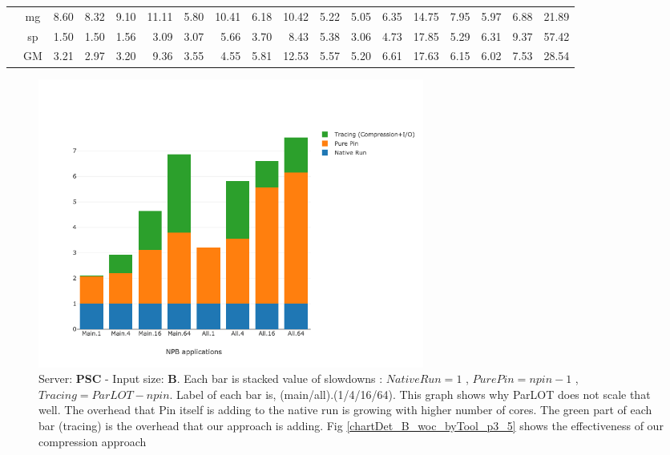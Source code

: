 \begin{table}[]
\begin{center}
{\begin{tabular}{|c|c|rrrr|rrrr|rrrr|rrrr|}
 &  mg  &  8.60  & \cellcolor{blue!25} 8.32  &  9.10  &  11.11  &  5.80  &  10.41  & \cellcolor{blue!25}  6.18  &  10.42  &   5.22  & \cellcolor{blue!25}  5.05  &   6.35  &  14.75  &  7.95  & \cellcolor{blue!25} 5.97  &  6.88  &  21.89 \\
 &  sp  &  1.50  &  1.50  &  1.56  &   3.09  &  3.07  &   5.66  & \cellcolor{blue!25}  3.70  &   8.43  &   5.38  & \cellcolor{blue!25}  3.06  &   4.73  &  17.85  &  5.29  &  6.31  &  9.37  &  57.42 \\ \cline{2-18}
 &  GM  &  3.21  & \cellcolor{blue!25} 2.97  &  3.20  &   9.36  &  3.55  &   4.55  &   5.81  &  12.53  &   5.57  & \cellcolor{blue!25}  5.20  &   6.61  &  17.63  &  6.15  & \cellcolor{blue!25} 6.02  &  7.53  &  28.54 \\
\hline 
\end{tabular} }

\end{center}
\end{table}

\begin{figure}[!t]
\centering
\includegraphics[width=5in]{figs.psc/chartDet_B_wc_byTool_p3_5.png}
\caption{Server: \textbf{PSC} - Input size: \textbf{B}. Each bar is stacked value of slowdowns : $Native Run = 1$ , $Pure Pin = npin - 1$ , $Tracing = ParLOT - npin$. Label of each bar is, (main/all).(1/4/16/64). This graph shows why ParLOT does not scale that well. The overhead that Pin itself is adding to the native run is growing with higher number of cores. The green part of each bar (tracing) is the overhead that our approach is adding. Fig \ref{chartDet_B_woc_byTool_p3_5} shows the effectiveness of our compression approach}
\label{chartDet_B_wc_byTool_p3_5}
\end{figure}


